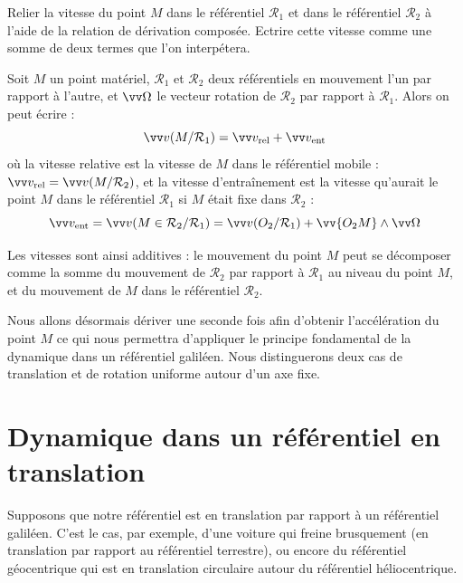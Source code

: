 \documentclass[11pt,fleqn]{book} %
\newcommand{\rref}{\mathcal{R}}
\begin{document}
\begin{capex}
	Relier la vitesse du point $M$ dans le référentiel $\rref_1$ et dans le référentiel $\rref_2$ à l'aide de la relation de dérivation composée. Ectrire cette vitesse comme une somme de deux termes que l'on interpétera.
\end{capex}

\begin{theorem}
	Soit $M$ un point matériel, $\rref_1$ et $\rref_2$ deux référentiels en mouvement l'un par rapport à l'autre, et $\vv \Omega$ le vecteur rotation de $\rref_2$ par rapport à $\rref_1$. Alors on peut écrire :
	\begin{equation}
		\vv v(M/\rref_1) = \vv v_{\rm rel} + \vv v_{\rm ent}
	\end{equation}
	où la vitesse relative est la vitesse de $M$ dans le référentiel mobile : $\vv v_{\rm rel} = \vv v(M/\rref_2)$, et la vitesse d'entraînement est la vitesse qu'aurait le point $M$ dans le référentiel $\rref_1$ si $M$ était fixe dans $\rref_2$ : 
	\begin{equation}
		\vv v_{\rm ent} = \vv v(M \in \rref_2/\rref_1) = \vv v(O_2/\rref_1) + \vv{O_2M} \wedge \vv \Omega
	\end{equation}
\end{theorem}

Les vitesses sont ainsi additives : le mouvement du point $M$ peut se décomposer comme la somme du mouvement de $\rref_2$ par rapport à $\rref_1$ au niveau du point $M$, et du mouvement de $M$ dans le référentiel $\rref_2$.

Nous allons désormais dériver une seconde fois afin d'obtenir l'accélération du point $M$ ce qui nous permettra d'appliquer le principe fondamental de la dynamique dans un référentiel galiléen. Nous distinguerons deux cas de translation et de rotation uniforme autour d'un axe fixe.

\section{Dynamique dans un référentiel en translation}

Supposons que notre référentiel est en translation par rapport à un référentiel galiléen. C'est le cas, par exemple, d'une voiture qui freine brusquement (en translation par rapport au référentiel terrestre), ou encore du référentiel géocentrique qui est en translation circulaire autour du référentiel héliocentrique.
\end{document}
